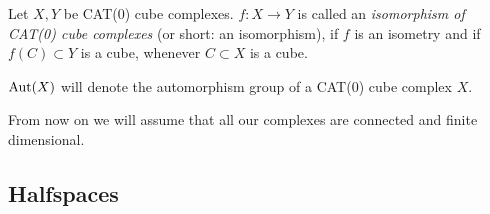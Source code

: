 \begin{thm}
  
\end{thm}

\begin{defin}
  Let \(X,Y\) be CAT(0) cube complexes. \(f\colon X \to Y\) is called an \emph{isomorphism of CAT(0) cube complexes} (or short: an isomorphism), if \(f\) is an isometry and if \(f(C) \subset Y\) is a cube, whenever \(C \subset X\) is a cube.

  \(\operatorname{Aut}(X)\) will denote the automorphism group of a CAT(0) cube complex \(X\).
\end{defin}

\begin{rem}
  From now on we will assume that all our complexes are connected and finite dimensional.
\end{rem}

\subsection{Halfspaces}
\label{sec:halfspaces}



